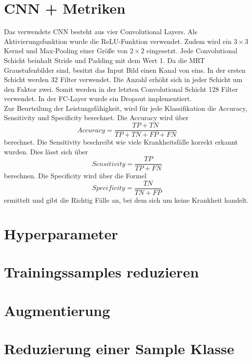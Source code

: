 \section{CNN + Metriken}

Das verwendete CNN besteht aus vier Convolutional Layers. Als Aktivierungsfunktion wurde die ReLU-Funktion verwendet.
Zudem wird ein $3 \times 3$ Kernel und Max-Pooling einer Größe von $2 \times 2$ eingesetzt. 
Jede Convolutional Schicht beinhalt Stride und Padding mit dem Wert 1.
Da die MRT Graustufenbilder sind, besitzt das Input Bild einen Kanal von eins. 
In der ersten Schicht werden 32 Filter verwendet.
Die Anzahl erhöht sich in jeder Schicht um den Faktor zwei.
Somit werden in der letzten Convolutional Schicht 128 Filter verwendet.
In der FC-Layer wurde ein Dropout implementiert.\\

Zur Beurteilung der Leistungsfähigkeit, wird für jede Klassifikation die Accuracy, Sensitivity und Specificity berechnet.
Die Accuracy wird über
\begin{equation}
  Accuracy = \frac{TP + TN}{TP + TN + FP + FN}
\end{equation}
berechnet.
Die Sensitivity beschreibt wie viele Krankheitsfälle korrekt erkannt wurden. Dies lässt sich über
\begin{equation}
  Sensitivity = \frac{TP}{TP + FN}
\end{equation}
berechnen.
Die Specificity wird über die Formel
\begin{equation}
  Specificity = \frac{TN}{TN + FP}
\end{equation}
ermittelt und gibt die Richtig Fälle an, bei dem sich um keine Krankheit handelt.%

\section{Hyperparameter}



\section{Trainingssamples reduzieren}


\section{Augmentierung}


\section{Reduzierung einer Sample Klasse}

